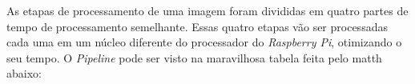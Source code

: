 As etapas de processamento de uma imagem foram divididas em quatro partes de tempo de processamento semelhante. Essas quatro etapas vão ser processadas cada uma em um núcleo diferente do processador do \emph{Raspberry Pi}, otimizando o seu tempo. O \emph{Pipeline} pode ser visto na maravilhosa tabela feita pelo matth abaixo:




















